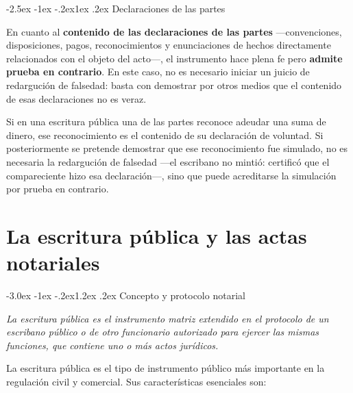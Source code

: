 \documentclass[12pt,oneside]{book}
\makeatletter
\renewcommand\section{\@startsection{section}{1}{\z@}%
  {-3.0ex \@plus -1ex \@minus -.2ex}{1.2ex \@plus .2ex}%
  {\normalfont\large\bfseries\color{acento}}}
\renewcommand\subsection{\@startsection{subsection}{2}{\z@}%
  {-2.5ex \@plus -1ex \@minus -.2ex}{1ex \@plus .2ex}%
  {\normalfont\normalsize\bfseries}}
\makeatother
\begin{document}
\subsection{Declaraciones de las partes}

En cuanto al \textbf{contenido de las declaraciones de las partes} ---convenciones, disposiciones, pagos, reconocimientos y enunciaciones de hechos directamente relacionados con el objeto del acto---, el instrumento hace plena fe pero \textbf{admite prueba en contrario}. En este caso, no es necesario iniciar un juicio de redargución de falsedad: basta con demostrar por otros medios que el contenido de esas declaraciones no es veraz.

\begin{ejemplo}
Si en una escritura pública una de las partes reconoce adeudar una suma de dinero, ese reconocimiento es el contenido de su declaración de voluntad. Si posteriormente se pretende demostrar que ese reconocimiento fue simulado, no es necesaria la redargución de falsedad ---el escribano no mintió: certificó que el compareciente hizo esa declaración---, sino que puede acreditarse la simulación por prueba en contrario.
\end{ejemplo}


\chapter{La escritura pública y las actas notariales}

\section{Concepto y protocolo notarial}

\begin{regla}
\textit{La escritura pública es el instrumento matriz extendido en el protocolo de un escribano público o de otro funcionario autorizado para ejercer las mismas funciones, que contiene uno o más actos jurídicos.}
\end{regla}

La escritura pública es el tipo de instrumento público más importante en la regulación civil y comercial. Sus características esenciales son:
\end{document}
